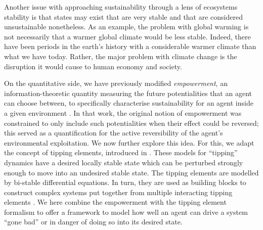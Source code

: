 \documentclass[conference]{IEEEtran}
\begin{document}
Another issue with approaching sustainability through a lens of
ecosystems stability is that states may exist that are very stable and
that are considered unsustainable nonetheless. As an example, the
problem with global warming is not necessarily that a warmer global
climate would be less stable. Indeed, there have been periods in the
earth's history with a considerable warmer climate than what we have
today. Rather, the major problem with climate change is the disruption
it would cause to human economy and society.





On the quantitative side, we have previously modified
\emph{empowerment}, an information-theoretic quantity measuring the
future potentialities that an agent can choose between, to
specifically characterise sustainability for an agent inside a given
environment \cite{Kim2009_sustainability}. In that work, the original
notion of empowerment was constrained to only include such
potentialities when their effect could be reversed; this served as a
quantification for the active reversibility of the agent's
environmental exploitation. We now further explore this idea. For
this, we adapt the concept of tipping elements, introduced in
\cite{Lenton2008_tippingelements}. These models for ``tipping''
dynamics have a desired locally stable state which can be perturbed
strongly enough to move into an undesired stable state. The tipping
elements are modelled by bi-stable differential equations. In turn,
they are used as building blocks to construct complex systems put
together from multiple interacting tipping elements
\cite{Brummitt2015_coupledcatastrophes,Klose2019_interactingtippingelements}.
We here combine the empowerment with the tipping element formalism to
offer a framework to model how well an agent can drive a system ``gone
bad'' or in danger of doing so into its desired state.

\end{document}
